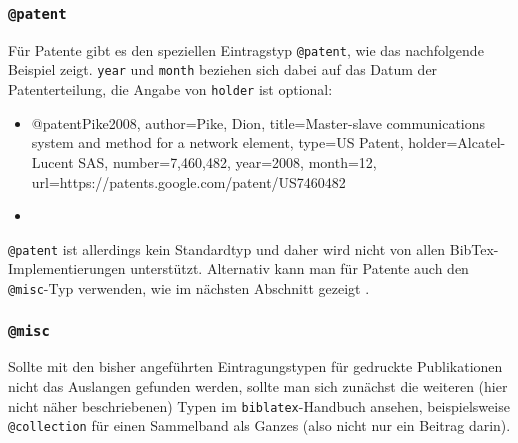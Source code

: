 
\subsubsection{\texttt{@patent}}
\label{sec:@patent}

Für Patente gibt es den speziellen Eintragstyp \texttt{@patent},
wie das nachfolgende Beispiel zeigt. 
\texttt{year} und \texttt{month} beziehen sich dabei auf das Datum der
Patenterteilung, die Angabe von \texttt{holder} ist optional:
%
\begin{itemize}
\item[]
\begin{GenericCode}[numbers=none]
@patent{Pike2008,
	author={Pike, Dion},
 	title={Master-slave communications system and method for a network element},
	type={US Patent},
	holder={Alcatel-Lucent SAS},
	number={7,460,482},
	year={2008},
	month={12},
	url={https://patents.google.com/patent/US7460482}
}
\end{GenericCode}
\item[\cite{Pike2008}] 
\end{itemize}
%
\texttt{@patent} ist allerdings kein Standardtyp und daher wird nicht
von allen BibTex-Imple\-mentier\-ungen unterstützt.
Alternativ kann man für Patente auch den \texttt{@misc}-Typ verwenden,
wie im nächsten Abschnitt gezeigt \cite{Hough1962}.


\subsubsection{\texttt{@misc}}
\label{sec:@misc}

Sollte mit den bisher angeführten Eintragungstypen für gedruckte Publikationen
nicht das Auslangen gefunden werden, sollte man sich zunächst die weiteren (hier nicht näher beschriebenen) 
Typen im \texttt{biblatex}-Handbuch \cite{Lehman2018} ansehen, beispielsweise
\texttt{@collection} für einen Sammelband als Ganzes (also nicht nur ein Beitrag darin).

